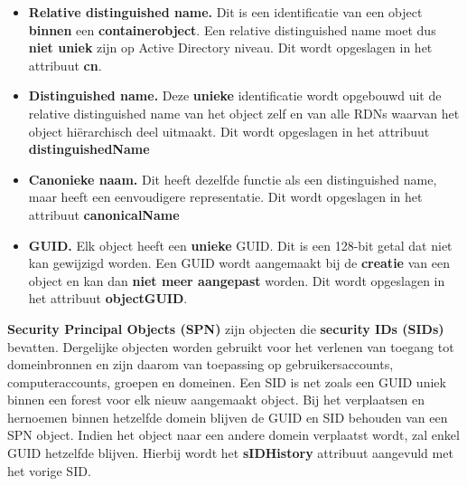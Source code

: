\documentclass{report}
\begin{document}
	\begin{enumerate}
		{ 
			\begin{itemize}
				\item \textbf{Relative distinguished name.} Dit is een identificatie van een object \textbf{binnen} een \textbf{containerobject}. Een relative distinguished name moet dus \textbf{niet uniek} zijn op Active Directory niveau. Dit wordt opgeslagen in het attribuut \textbf{cn}.
				
				\item \textbf{Distinguished name.} Deze \textbf{unieke} identificatie wordt opgebouwd uit de relative distinguished name van het object zelf en van alle RDNs waarvan het object hiërarchisch deel uitmaakt. Dit wordt opgeslagen in het attribuut \textbf{distinguishedName}
				
				\item \textbf{Canonieke naam.} Dit heeft dezelfde functie als een distinguished name, maar heeft een eenvoudigere representatie. Dit wordt opgeslagen in het attribuut \textbf{canonicalName}
				
				\item \textbf{GUID.} Elk object heeft een \textbf{unieke} GUID. Dit is een 128-bit getal dat niet kan gewijzigd worden. Een GUID wordt aangemaakt bij de \textbf{creatie} van een object en kan dan \textbf{niet meer aangepast} worden. Dit wordt opgeslagen in het attribuut \textbf{objectGUID}.
			\end{itemize}
			
		}	
		 { 
			\textbf{Security Principal Objects (SPN)} zijn objecten die \textbf{security IDs (SIDs)} bevatten. Dergelijke objecten worden gebruikt voor het verlenen van toegang tot domeinbronnen en zijn daarom van toepassing op gebruikersaccounts, computeraccounts, groepen en domeinen. Een SID is net zoals een GUID uniek binnen een forest voor elk nieuw aangemaakt object. Bij het verplaatsen en hernoemen binnen hetzelfde domein blijven de GUID en SID behouden van een SPN object. Indien het object naar een andere domein verplaatst wordt, zal enkel GUID hetzelfde blijven. Hierbij wordt het \textbf{sIDHistory} attribuut aangevuld met het vorige SID.	
		}
		

\end{enumerate}
\end{document}
